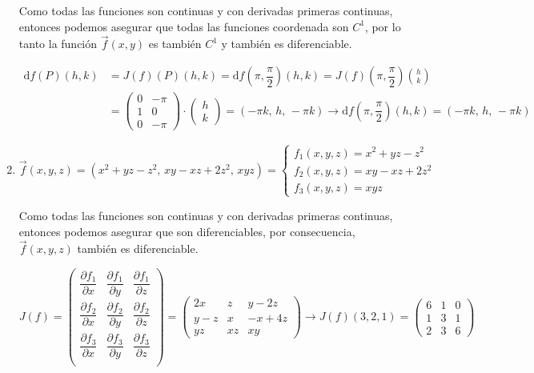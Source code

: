 \begin{enumerate}[label=\c olor{red}\textbf{\arabic*)}, leftmargin=*]
Como todas las funciones son continuas y con derivadas primeras continuas, entonces podemos asegurar que todas las funciones coordenada son $C^{1}$, por lo tanto la función $\vec{f}(x,y)$ es también $C^{1}$ y también es diferenciable.

\[ \begin{aligned}
\mathrm{d}f(P)(h,k)&=J(f)(P)(h,k)=\mathrm{d}f\left(\pi,\dfrac{\pi}{2}\right)(h,k)=J(f)\left(\pi,\dfrac{\pi}{2}\right)\binom{h}{k}\\
&=\begin{pmatrix}
0 & -\pi \\ 
1 & 0 \\ 
0 & -\pi
\end{pmatrix}\cdot\begin{pmatrix}
h\\
k
\end{pmatrix}=\left(-\pi k,\,h,\,-\pi k\right)\longrightarrow \mathrm{d}f\left(\pi,\dfrac{\pi}{2}\right)(h,k)=\left(-\pi k,\,h,\,-\pi k\right)
\end{aligned} \]

\item {}

$\vec{f}(x,y,z)=(x^{2}+yz-z^{2},\, xy-xz+2z^{2},\, xyz)=\begin{cases}
f_1(x,y,z)=x^{2}+yz-z^{2}\\
f_2(x,y,z)=xy-xz+2z^{2}\\
f_3(x,y,z)=xyz
\end{cases}$

Como todas las funciones son continuas y con derivadas primeras continuas, entonces podemos asegurar que son diferenciables, por consecuencia, $\vec{f}(x,y,z)$ también es diferenciable.

$J(f)=\begin{pmatrix}
\dfrac{\partial f_{1}}{\partial x} & \dfrac{\partial f_1}{\partial y} & \dfrac{\partial f_1}{\partial z} \\ 
\dfrac{\partial f_{2}}{\partial x} & \dfrac{\partial f_2}{\partial y} & \dfrac{\partial f_2}{\partial z} \\ 
\dfrac{\partial f_{3}}{\partial x} & \dfrac{\partial f_3}{\partial y} & \dfrac{\partial f_3}{\partial z} \\ 
\end{pmatrix}=\begin{pmatrix}
2x & z & y-2z \\
y-z & x & -x+4z \\
yz & xz & xy
\end{pmatrix}\longrightarrow J(f)(3,2,1)=\begin{pmatrix}
6 & 1 & 0 \\
1 & 3 & 1 \\
2 & 3 & 6
\end{pmatrix}$


\end{enumerate}
